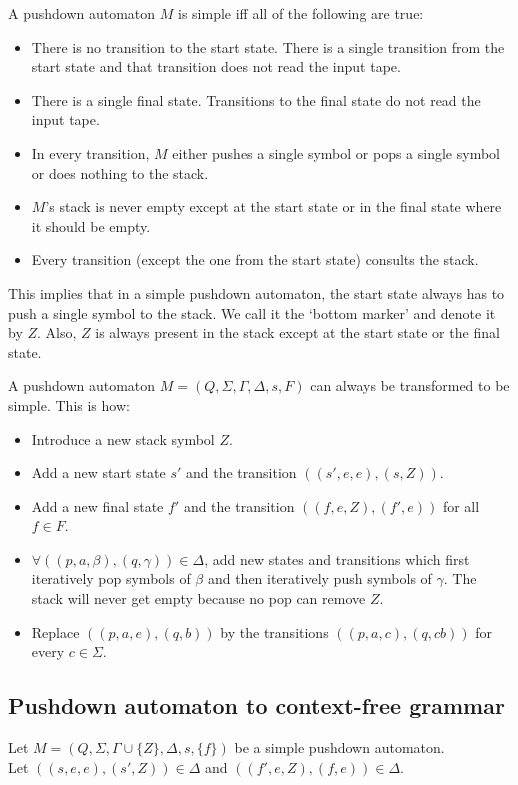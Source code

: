 A pushdown automaton $M$ is simple iff all of the following are true:
\begin{itemize}
\item There is no transition to the start state.
    There is a single transition from the start state
    and that transition does not read the input tape.
\item There is a single final state.
    Transitions to the final state do not read the input tape.
\item In every transition, $M$ either pushes a single symbol or pops a single symbol or does nothing to the stack.
\item $M$'s stack is never empty except at the start state or in the final state where it should be empty.
\item Every transition (except the one from the start state) consults the stack.
\end{itemize}

This implies that in a simple pushdown automaton,
the start state always has to push a single symbol to the stack.
We call it the `bottom marker' and denote it by $Z$.
Also, $Z$ is always present in the stack except at the start state or the final state.

A pushdown automaton $M = (Q, \Sigma, \Gamma, \Delta, s, F)$
can always be transformed to be simple. This is how:
\begin{itemize}
\item Introduce a new stack symbol $Z$.
\item Add a new start state $s'$ and the transition $((s', e, e), (s, Z))$.
\item Add a new final state $f'$ and the transition $((f, e, Z), (f', e))$ for all $f \in F$.
\item $\forall ((p, a, \beta), (q, \gamma)) \in \Delta$, add new states and transitions which
    first iteratively pop symbols of $\beta$ and then iteratively push symbols of $\gamma$.
    The stack will never get empty because no pop can remove $Z$.
\item Replace $((p, a, e), (q, b))$ by the transitions $((p, a, c), (q, cb))$ for every $c \in \Sigma$.
\end{itemize}

\subsection{Pushdown automaton to context-free grammar}

Let $M = (Q, \Sigma, \Gamma \cup \{Z\}, \Delta, s, \{f\})$ be a simple pushdown automaton.\\
Let $((s,e,e), (s',Z)) \in \Delta$ and $((f',e,Z), (f,e)) \in \Delta$.

